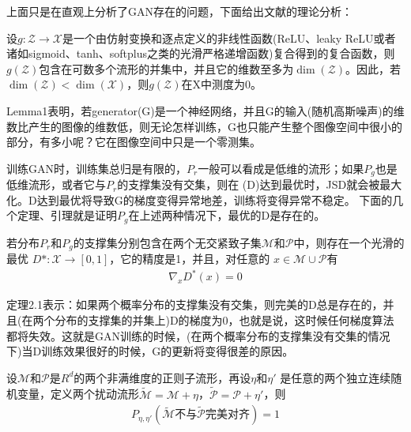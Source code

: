             \par
            上面只是在直观上分析了GAN存在的问题，下面给出文献\cite{2017.Arjovsky}的理论分析：
            \begin{lemma}[Lemma1 ]
            设$g:\mathcal{Z}\to \mathcal{X}$是一个由仿射变换和逐点定义的非线性函数(ReLU、leaky ReLU或者诸如sigmoid、tanh、softplus之类的光滑严格递增函数)复合得到的复合函数，则$g(\mathcal{Z})$包含在可数多个流形的并集中，并且它的维数至多为$\dim(\mathcal{Z})$。因此，若$\dim(\mathcal{Z}) < \dim(\mathcal{X})$，则$g(\mathcal{Z})$在X中测度为0。
            \end{lemma}
            \par
            Lemma1表明，若generator(G)是一个神经网络，并且G的输入(随机高斯噪声)的维数比产生的图像的维数低，则无论怎样训练，G也只能产生整个图像空间中很小的部分，有多小呢？它在图像空间中只是一个零测集。
            \par
            训练GAN时，训练集总归是有限的，$P_r$一般可以看成是低维的流形；如果$P_g$也是低维流形，或者它与$P_r$的支撑集没有交集，则在 (D)达到最优时，JSD就会被最大化。D达到最优将导致G的梯度变得异常地差，训练将变得异常不稳定。
            下面的几个定理、引理就是证明$P_g$在上述两种情况下，最优的D是存在的。
            \begin{theorem}[Theorem2.1]
            若分布$P_r$和$P_g$的支撑集分别包含在两个无交紧致子集$\mathcal{M}$和$\mathcal{P}$中，则存在一个光滑的最优 $D*: \mathcal{X} \to [0,1]$，它的精度是1，并且，对任意的
            $x\in \mathcal{M} \cup \mathcal{P}$有
            \begin{align*}
            \nabla _x D^*(x) = 0
            \end{align*}
            \end{theorem}
            \par
            定理2.1表示：如果两个概率分布的支撑集没有交集，则完美的D总是存在的，并且(在两个分布的支撑集的并集上)D的梯度为0，也就是说，这时候任何梯度算法都将失效。这就是GAN训练的时候，(在两个概率分布的支撑集没有交集的情况下)当D训练效果很好的时候，G的更新将变得很差的原因。
            \begin{lemma}[Lemma 2]
            设$\mathcal{M}$和$\mathcal{P}$是$R^d$的两个非满维度的正则子流形，再设$\eta$和$\eta'$ 是任意的两个独立连续随机变量，定义两个扰动流形$\tilde{\mathcal{M}} = \mathcal{M} + \eta$，$\tilde{\mathcal{P}}= \mathcal{P} + \eta'$，则
            \begin{align*}
            P_{\eta,\eta'}(\tilde{\mathcal{M}}\text{不与}\tilde{\mathcal{P}}\text{完美对齐}) = 1
            \end{align*}
            \end{lemma}
